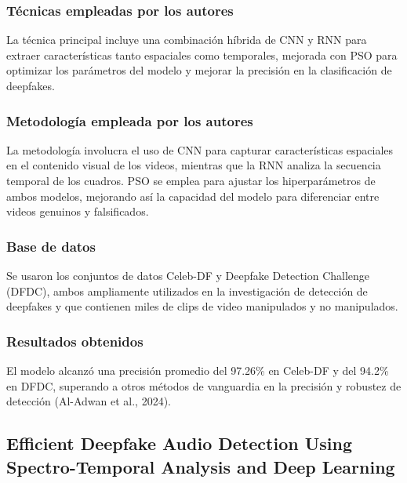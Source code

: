 \subsubsection{Técnicas empleadas por los autores}
La técnica principal incluye una combinación híbrida de CNN y RNN para extraer características tanto espaciales como temporales, mejorada con PSO para optimizar los parámetros del modelo y mejorar la precisión en la clasificación de deepfakes.

\subsubsection{Metodología empleada por los autores}
La metodología involucra el uso de CNN para capturar características espaciales en el contenido visual de los videos, mientras que la RNN analiza la secuencia temporal de los cuadros. PSO se emplea para ajustar los hiperparámetros de ambos modelos, mejorando así la capacidad del modelo para diferenciar entre videos genuinos y falsificados.

\subsubsection{Base de datos}
Se usaron los conjuntos de datos Celeb-DF y Deepfake Detection Challenge (DFDC), ambos ampliamente utilizados en la investigación de detección de deepfakes y que contienen miles de clips de video manipulados y no manipulados.

\subsubsection{Resultados obtenidos}
El modelo alcanzó una precisión promedio del 97.26\% en Celeb-DF y del 94.2\% en DFDC, superando a otros métodos de vanguardia en la precisión y robustez de detección (Al-Adwan et al., 2024).

\subsection{Efficient Deepfake Audio Detection Using Spectro-Temporal Analysis and Deep Learning \citep*{sunkari2024spectro_temporal}}

